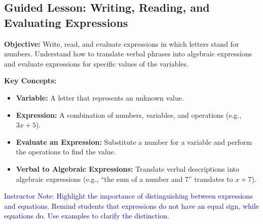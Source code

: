 \documentclass[12pt]{article}
\title{}
\date{}
\begin{document}
\subsection*{Guided Lesson: Writing, Reading, and Evaluating Expressions}
\onehalfspacing

\begin{tcolorbox}[colframe=black!40, colback=gray!5, 
coltitle=black, colbacktitle=black!20, fonttitle=\bfseries\Large, 
title=Learning Objective, halign title=center, left=5pt, right=5pt, top=5pt, bottom=15pt]
\textbf{Objective:} Write, read, and evaluate expressions in which letters stand for numbers. Understand how to translate verbal phrases into algebraic expressions and evaluate expressions for specific values of the variables.
\end{tcolorbox}

\begin{tcolorbox}[colframe=black!60, colback=white, 
coltitle=black, colbacktitle=black!15, fonttitle=\bfseries\Large, 
title=Key Concepts and Vocabulary, halign title=center, left=10pt, right=10pt, top=10pt, bottom=15pt]
\textbf{Key Concepts:}
\begin{itemize}
    \item \textbf{Variable:} A letter that represents an unknown value.
    \item \textbf{Expression:} A combination of numbers, variables, and operations (e.g., \( 3x + 5 \)).
    \item \textbf{Evaluate an Expression:} Substitute a number for a variable and perform the operations to find the value.
    \item \textbf{Verbal to Algebraic Expressions:} Translate verbal descriptions into algebraic expressions (e.g., “the sum of a number and 7” translates to \( x + 7 \)).
\end{itemize}
\textcolor{blue}{Instructor Note: Highlight the importance of distinguishing between expressions and equations. Remind students that expressions do not have an equal sign, while equations do. Use examples to clarify the distinction.}
\end{tcolorbox}
\end{document}
